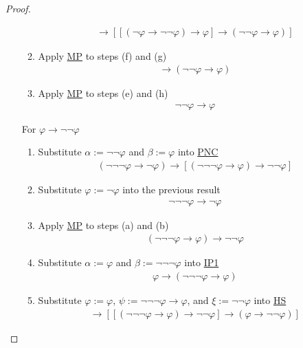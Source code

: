 \documentclass{treatise}
\begin{document}
\begin{proof}
\begin{enumerate}
\begin{enumerate}
\begin{align*}
            [\neg \neg \varphi \to (\neg \varphi \to \neg \neg \varphi)] \to [[(\neg \varphi \to \neg \neg \varphi) \to \varphi] \to (\neg \neg \varphi \to \varphi)]
        \end{align*}
        \item Apply \hyperref[HPL-R-MP]{MP} to steps (f) and (g)
        \begin{align*}
            [(\neg \varphi \to \neg \neg \varphi) \to \varphi] \to (\neg \neg \varphi \to \varphi)
        \end{align*}
        \item Apply \hyperref[HPL-R-MP]{MP} to steps (e) and (h)
        \begin{align*}
            \neg \neg \varphi \to \varphi
        \end{align*}
    \end{enumerate}
    For $\varphi \to \neg \neg \varphi$
    \begin{enumerate}
        \item Substitute $\alpha := \neg \neg \varphi$ and $\beta := \varphi$ into \hyperref[HPL-A-PNC]{PNC}
        \begin{align*}
            (\neg \neg \neg \varphi \to \neg \varphi) \to [(\neg \neg \neg \varphi \to \varphi) \to \neg \neg \varphi]
        \end{align*}
        \item Substitute $\varphi := \neg \varphi$ into the previous result
        \begin{align*}
            \neg \neg \neg \varphi \to \neg \varphi
        \end{align*}
        \item Apply \hyperref[HPL-R-MP]{MP} to steps (a) and (b)
        \begin{align*}
            (\neg \neg \neg \varphi \to \varphi) \to \neg \neg \varphi
        \end{align*}
        \item Substitute $\alpha := \varphi$ and $\beta := \neg \neg \neg \varphi$ into \hyperref[HPL-A-IP1]{IP1}
        \begin{align*}
            \varphi \to (\neg \neg \neg \varphi \to \varphi)
        \end{align*}
        \item Substitute $\varphi := \varphi$, $\psi := \neg \neg \neg \varphi \to \varphi$, and $\xi := \neg \neg \varphi$ into \hyperref[HPL-T-HS]{HS}
        \begin{align*}
            [\varphi \to (\neg \neg \neg \varphi \to \varphi)] \to [[(\neg \neg \neg \varphi \to \varphi) \to \neg \neg \varphi] \to (\varphi \to \neg \neg \varphi)]

\end{align*}
\end{enumerate}
\end{enumerate}
\end{proof}
\end{document}
